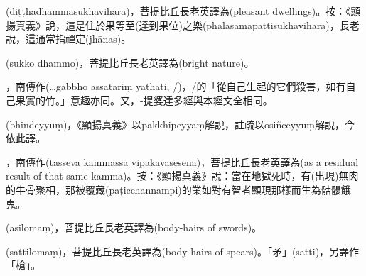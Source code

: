 \startitemgroup[noteitems]
\item{}(diṭṭhadhammasukhavihārā)，菩提比丘長老英譯為(pleasant dwellings)。按：《顯揚真義》說，這是住於果等至(達到果位)之樂(phalasamāpattisukhavihārā)，長老說，這通常指禪定(jhānas)。
\stopitemgroup

\startitemgroup[noteitems]
\item{}(sukko dhammo)，菩提比丘長老英譯為(bright nature)。
\stopitemgroup

\startitemgroup[noteitems]
\item{}，南傳作(…gabbho assatariṃ yathāti, /)，/的「從自己生起的它們殺害，如有自己果實的竹。」意趣亦同。又，-提婆達多經與本經文全相同。
\stopitemgroup

\startitemgroup[noteitems]
\item{}(bhindeyyuṃ)，《顯揚真義》以pakkhipeyyaṃ解說，註疏以osiñceyyuṃ解說，今依此譯。
\stopitemgroup

\startitemgroup[noteitems]
\item{}，南傳作(tasseva kammassa vipākāvasesena)，菩提比丘長老英譯為(as a residual result of that same kamma)。按：《顯揚真義》說：當在地獄死時，有(出現)無肉的牛骨聚相，那被覆藏(paṭicchannampi)的業如對有智者顯現那樣而生為骷髏餓鬼。
\stopitemgroup

\startitemgroup[noteitems]
\item{}(asilomaṃ)，菩提比丘長老英譯為(body-hairs of swords)。
\stopitemgroup

\startitemgroup[noteitems]
\item{}(sattilomaṃ)，菩提比丘長老英譯為(body-hairs of spears)。「矛」(satti)，另譯作「槍」。
\stopitemgroup

